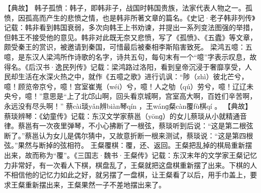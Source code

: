\documentclass[12pt,UTF8]{ctexbook}
\begin{document}
【典故】
韩子孤愤：韩子，即韩非子，战国时韩国贵族，法家代表人物之一。孤愤，因孤高而产生的悲愤之情，也是韩非所著文章的篇名。《史记·老子韩非列传》记载：韩非看到韩国衰弱，多次向韩王上书劝谏，并提出一系列变法图强的举措，但韩王不接受他的意见。韩非对此既无奈又悲愤，写了《孤愤》、《五蠹》等文章，颇受秦王的赏识，被邀请到秦国，可惜最后被秦相李斯陷害致死。
梁鸿五噫：五噫，是东汉人梁鸿所作诗歌的名字，诗共五句，每句末有一个“噫”字表示叹息，故得名。《后汉书·逸民列传》记载：梁鸿路过洛阳，看到皇帝沉浸于奢靡享受，人民却生活在水深火热之中，就作《五噫之歌》进行讥讽：“陟（zhì）彼北芒兮，噫！顾览帝京兮，噫！宫室崔嵬（wéi）兮，噫！人之劬（qú）劳兮，噫！辽辽未央兮，噫！”意思是“上了北邙山啊，回头看京城啊，宫室高大啊，百姓们辛苦啊，永远没有尽头啊！”
蔡cài琰yǎn辨biàn琴qín
，王wánɡ粲càn覆fù棋qí
。
【典故】
蔡琰辨琴：《幼童传》记载：东汉文学家蔡邕（yōnɡ）的女儿蔡琰从小就精通音律。蔡邕有一次夜里弹琴，不小心拂断了一根弦，蔡琰听到后说：“这是第二根弦断了。”蔡邕认为女儿是偶尔猜中，又故意折断一根来测试，蔡琰说：“这是第四根弦。”果然与断掉的弦相符。
王粲覆棋：覆，还、返回。王粲把乱掉的棋局重新摆出来，故而称为“覆”。《三国志·魏书·王粲传》记载：东汉末年的文学家王粲记忆力非常好，有一次看人下棋，棋盘乱了，王粲就把这盘棋重新摆了出来。下棋的人不相信他的记忆力如此之好，就另摆了一盘棋，让王粲看了以后，用手巾盖上，要求王粲重新摆出来，王粲果然一子不差地摆出来了。
\end{document}
